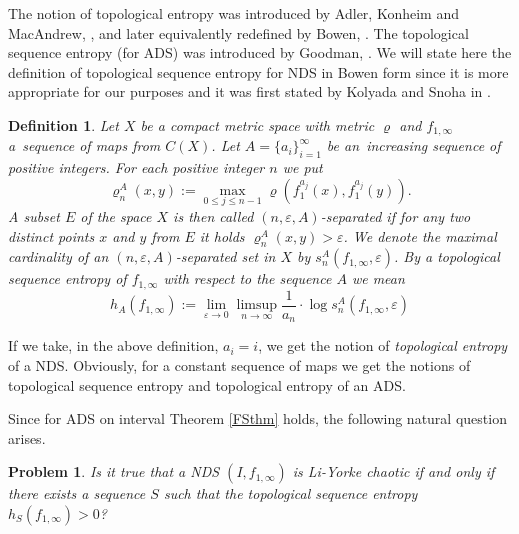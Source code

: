 \documentclass{amsart}
\newtheorem{conj}{Problem}
\newtheorem{defini}{Definition}
\begin{document}
The notion of topological entropy was introduced by Adler, Konheim and MacAndrew, \cite{TE1}, and later equivalently redefined by Bowen, \cite{TE2}. The topological sequence entropy (for ADS) was introduced by Goodman, \cite{Good}. We will state here the definition of topological sequence entropy for NDS in Bowen form since it is more appropriate for our purposes and it was first stated by Kolyada and Snoha in \cite{KS}.

\begin{defini}
Let $X$ be a compact metric space with metric $\varrho$ %
and $f_{1,\infty}$ a~sequence of maps from  $C(X)$. %
Let $A = \{a_i\}_{i=1}^\infty$ be an~increasing sequence of positive integers. For each positive integer $n$ we put $$\varrho_n^A(x,y) := \max_{0 \leq j \leq n-1} \varrho(f^{a_j}_1(x), f^{a_j}_1(y)).$$ A subset $E$ of the space $X$ is then called {\sl $(n,\varepsilon,A)$-separated} if for any two distinct points $x$ and $y$ from $E$ it holds $\varrho_n^A(x,y) > \varepsilon$. We denote the maximal cardinality of an $(n,\varepsilon,A)$-separated set in $X$ by $s_n^A(f_{1,\infty},\varepsilon)$. By a {\sl topological sequence entropy of $f_{1,\infty}$ with respect to the sequence $A$} we mean $$h_A(f_{1,\infty}) := \lim_{\varepsilon\rightarrow 0}\limsup_{n\rightarrow\infty} \frac{1}{a_n}\cdot\log s_n^A(f_{1,\infty},\varepsilon)$$
\end{defini}

If we take, in the above definition, $a_i = i$, we get the notion of  {\sl topological entropy} of a NDS. Obviously, for a constant sequence of maps we get the notions of topological sequence entropy and topological entropy of an ADS.

Since for ADS on interval Theorem \ref{FSthm} holds, the following natural question arises.
\begin{conj}
\label{FConj}
Is it true that a NDS $(I,f_{1,\infty})$ is Li-Yorke chaotic if and only if there exists a sequence $S$ such that the topological sequence entropy $h_S(f_{1,\infty}) > 0$?
\end{conj}
\end{document}
